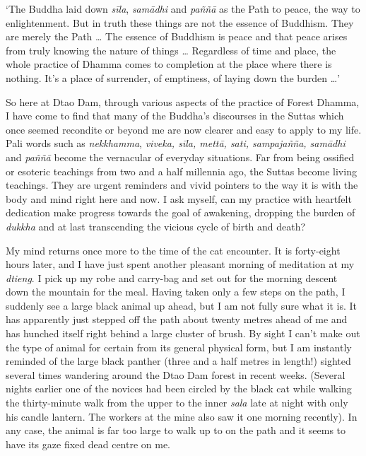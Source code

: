 `The Buddha laid down \emph{sīla}, \emph{samādhi} and \emph{paññā} as
the Path to peace, the way to enlightenment. But in truth these things
are not the essence of Buddhism. They are merely the Path \ldots{} The
essence of Buddhism is peace and that peace arises from truly knowing
the nature of things \ldots{} Regardless of time and place, the whole
practice of Dhamma comes to completion at the place where there is
nothing. It's a place of surrender, of emptiness, of laying down the
burden \ldots{}'

So here at Dtao Dam, through various aspects of the practice of Forest
Dhamma, I have come to find that many of the Buddha's discourses in the
Suttas which once seemed recondite or beyond me are now clearer and easy
to apply to my life. Pali words such as \emph{nekkhamma}, \emph{viveka,
sīla, mettā, sati, sampajañña, samādhi} and \emph{paññā} become the
vernacular of everyday situations. Far from being ossified or esoteric
teachings from two and a half millennia ago, the Suttas become living
teachings. They are urgent reminders and vivid pointers to the way it is
with the body and mind right here and now. I ask myself, can my practice
with heartfelt dedication make progress towards the goal of awakening,
dropping the burden of \emph{dukkha} and at last transcending the
vicious cycle of birth and death?

My mind returns once more to the time of the cat encounter. It is
forty-eight hours later, and I have just spent another pleasant morning
of meditation at my \emph{dtieng}. I pick up my robe and carry-bag and
set out for the morning descent down the mountain for the meal. Having
taken only a few steps on the path, I suddenly see a large black animal
up ahead, but I am not fully sure what it is. It has apparently just
stepped off the path about twenty metres ahead of me and has hunched
itself right behind a large cluster of brush. By sight I can't make out
the type of animal for certain from its general physical form, but I am
instantly reminded of the large black panther (three and a half metres
in length!) sighted several times wandering around the Dtao Dam forest
in recent weeks. (Several nights earlier one of the novices had been
circled by the black cat while walking the thirty-minute walk from the
upper to the inner \emph{sala} late at night with only his candle
lantern. The workers at the mine also saw it one morning recently). In
any case, the animal is far too large to walk up to on the path and it
seems to have its gaze fixed dead centre on me.

